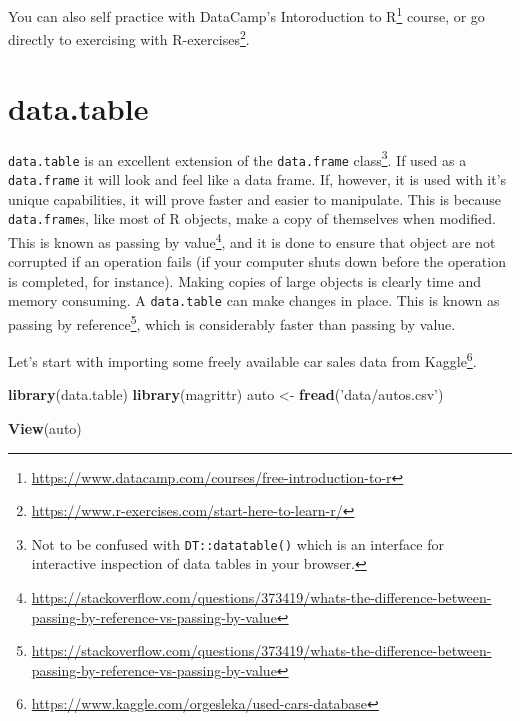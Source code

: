 \documentclass[]{book}
\newenvironment{Shaded}{\begin{snugshade}}{\end{snugshade}}
\newcommand{\KeywordTok}[1]{\textcolor[rgb]{0.13,0.29,0.53}{\textbf{#1}}}
\newcommand{\NormalTok}[1]{#1}
\newcommand{\StringTok}[1]{\textcolor[rgb]{0.31,0.60,0.02}{#1}}
\renewcommand{\href}[2]{#2\footnote{\url{#1}}}
\theoremstyle{definition}
\theoremstyle{definition}
\theoremstyle{definition}
\theoremstyle{remark}
\begin{document}
You can also self practice with DataCamp's \href{https://www.datacamp.com/courses/free-introduction-to-r}{Intoroduction to R} course, or go directly to exercising with \href{https://www.r-exercises.com/start-here-to-learn-r/}{R-exercises}.

\hypertarget{datatable}{%
\chapter{data.table}\label{datatable}}

\texttt{data.table} is an excellent extension of the \texttt{data.frame} class\footnote{Not to be confused with \texttt{DT::datatable()} which is an interface for interactive inspection of data tables in your browser.}.
If used as a \texttt{data.frame} it will look and feel like a data frame.
If, however, it is used with it's unique capabilities, it will prove faster and easier to manipulate.
This is because \texttt{data.frame}s, like most of R objects, make a copy of themselves when modified.
This is known as \href{https://stackoverflow.com/questions/373419/whats-the-difference-between-passing-by-reference-vs-passing-by-value}{passing by value}, and it is done to ensure that object are not corrupted if an operation fails (if your computer shuts down before the operation is completed, for instance).
Making copies of large objects is clearly time and memory consuming.
A \texttt{data.table} can make changes in place.
This is known as \href{https://stackoverflow.com/questions/373419/whats-the-difference-between-passing-by-reference-vs-passing-by-value}{passing by reference}, which is considerably faster than passing by value.

Let's start with importing some freely available car sales data from \href{https://www.kaggle.com/orgesleka/used-cars-database}{Kaggle}.

\begin{Shaded}
\begin{Highlighting}[]
\KeywordTok{library}\NormalTok{(data.table)}
\KeywordTok{library}\NormalTok{(magrittr)}
\NormalTok{auto <-}\StringTok{ }\KeywordTok{fread}\NormalTok{(}\StringTok{'data/autos.csv'}\NormalTok{)}
\end{Highlighting}
\end{Shaded}

\begin{Shaded}
\begin{Highlighting}[]
\KeywordTok{View}\NormalTok{(auto)}
\end{Highlighting}
\end{Shaded}
\end{document}
